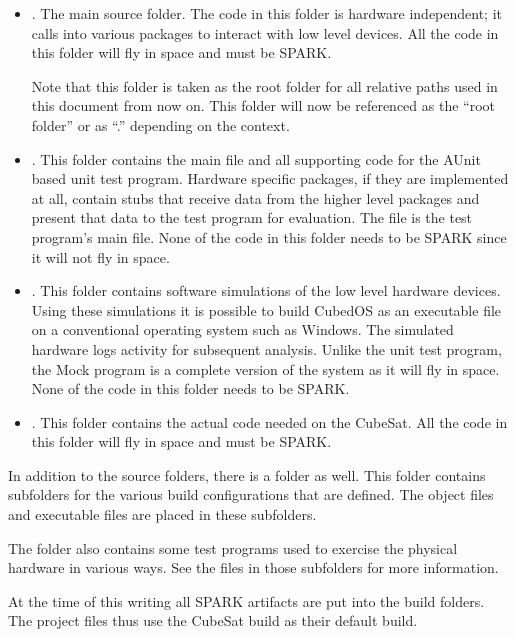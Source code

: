 \begin{itemize}

\item {}. The main source folder. The code in this folder is hardware independent;
  it calls into various packages to interact with low level devices. All the code in this folder
  will fly in space and must be SPARK.

  Note that this folder is taken as the root folder for all relative paths used in this document
  from now on. This folder will now be referenced as the ``root folder'' or as ``.'' depending
  on the context.

\item {}. This folder contains the main file and all supporting code for the AUnit
  based unit test program. Hardware specific packages, if they are implemented at all, contain
  stubs that receive data from the higher level packages and present that data to the test
  program for evaluation. The file  is the test program's main file. None of
  the code in this folder needs to be SPARK since it will not fly in space.

\item {}. This folder contains software simulations of the low level hardware
  devices. Using these simulations it is possible to build CubedOS as an executable file on a
  conventional operating system such as Windows. The simulated hardware logs activity for
  subsequent analysis. Unlike the unit test program, the Mock program is a complete version of
  the system as it will fly in space. None of the code in this folder needs to be SPARK.

\item {}. This folder contains the actual code needed on the CubeSat. All the
  code in this folder will fly in space and must be SPARK.

\end{itemize}

In addition to the source folders, there is a  folder as well. This folder
contains subfolders for the various build configurations that are defined. The object files and
executable files are placed in these subfolders.

The  folder also contains some test programs used to exercise the physical
hardware in various ways. See the  files in those subfolders for more
information.

At the time of this writing all SPARK artifacts are put into the  build
folders. The project files thus use the CubeSat build as their default build.
